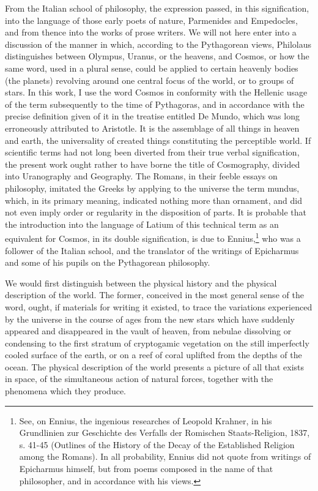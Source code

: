 From the Italian school of philosophy, the expression passed, in this signification, into the language of those early poets of nature, Parmenides and Empedocles, and from thence into the works of prose writers. We will not here enter into a discussion of the manner in which, according to the Pythagorean views, Philolaus distinguishes between Olympus, Uranus, or the heavens, and Cosmos, or how the same word, used in a plural sense, could be applied to certain heavenly bodies (the planets) revolving around one central focus of the world, or to groups of stars. In this work, I use the word Cosmos in conformity with the Hellenic usage of the term subsequently to the time of Pythagoras, and in accordance with the precise definition given of it in the treatise entitled De Mundo, which was long erroneously attributed to Aristotle. It is the assemblage of all things in heaven and earth, the universality of created things constituting the perceptible world. If scientific terms had not long been diverted from their true verbal signification, the present work ought rather to have borne the title of Cosmography, divided into Uranography and Geography. The Romans, in their feeble essays on philosophy, imitated the Greeks by applying to the universe the term mundus, which, in its primary meaning, indicated nothing more than ornament, and did not even imply order or regularity in the disposition of parts. It is probable that the introduction into the language of Latium of this technical term as an equivalent for Cosmos, in its double signification, is due to Ennius,\footnote{See, on Ennius, the ingenious researches of Leopold Krahner, in his Grundlinien zur Geschichte des Verfalls der Romischen Staats-Religion, 1837, s. 41-45 (Outlines of the History of the Decay of the Established Religion among the Romans). In all probability, Ennius did not quote from writings of Epicharmus himself, but from poems composed in the name of that philosopher, and in accordance with his views.} who was a follower of the Italian school, and the translator of the writings of Epicharmus and some of his pupils on the Pythagorean philosophy.

We would first distinguish between the physical history and the physical description of the world. The former, conceived in the most general sense of the word, ought, if materials for writing it existed, to trace the variations experienced by the universe in the course of ages from the new stars which have suddenly appeared and disappeared in the vault of heaven, from nebulae dissolving or condensing to the first stratum of cryptogamic vegetation on the still imperfectly cooled surface of the earth, or on a reef of coral uplifted from the depths of the ocean. The physical description of the world presents a picture of all that exists in space, of the simultaneous action of natural forces, together with the phenomena which they produce.

